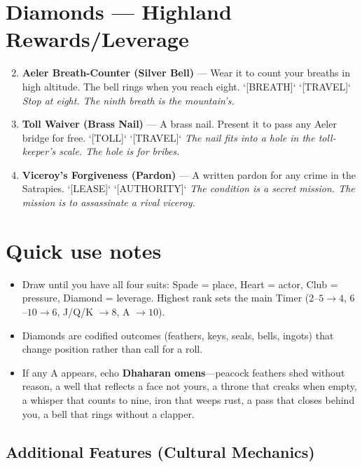\section*{Diamonds --- Highland Rewards/Leverage}
\label{sec:dhahara-highland-rewards}
\begin{enumerate}
\setcounter{enumi}{1}
\item \textbf{Aeler Breath-Counter (Silver Bell)} --- Wear it to count your breaths in high altitude. The bell rings when you reach eight. `[BREATH]` `[TRAVEL]`
  \hfill \textit{Stop at eight. The ninth breath is the mountain's.}
\item \textbf{Toll Waiver (Brass Nail)} --- A brass nail. Present it to pass any Aeler bridge for free. `[TOLL]` `[TRAVEL]`
  \hfill \textit{The nail fits into a hole in the toll-keeper's scale. The hole is for bribes.}
\item \textbf{Viceroy's Forgiveness (Pardon)} --- A written pardon for any crime in the Satrapies. `[LEASE]` `[AUTHORITY]`
  \hfill \textit{The condition is a secret mission. The mission is to assassinate a rival viceroy.}
\end{enumerate}

\section*{Quick use notes}
\label{sec:dhahara-quick-use}
\begin{itemize}
\item Draw until you have all four suits: Spade = place, Heart = actor, Club = pressure, Diamond = leverage. Highest rank sets the main Timer (\(2\)--\(5 \rightarrow 4\), \(6\)--\(10 \rightarrow 6\), J/Q/K \(\rightarrow 8\), A \(\rightarrow 10\)).
\item Diamonds are codified outcomes (feathers, keys, seals, bells, ingots) that change position rather than call for a roll.
\item If any A appears, echo \textbf{Dhaharan omens}---peacock feathers shed without reason, a well that reflects a face not yours, a throne that creaks when empty, a whisper that counts to nine, iron that weeps rust, a pass that closes behind you, a bell that rings without a clapper.
\end{itemize}

\subsection*{Additional Features (Cultural Mechanics)}
\label{sec:dhahara-mechanics}

